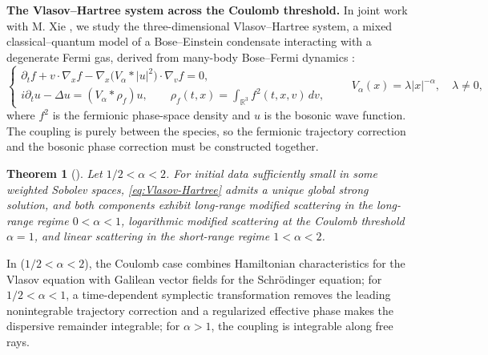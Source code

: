 \documentclass[10pt,reqno]{amsart}
\newtheorem{theorem}{Theorem}
\theoremstyle{definition}
\begin{document}
\noindent\textbf{The Vlasov--Hartree system across the Coulomb threshold.} In joint work with M. Xie \cite{HX26a,HX26b}, we study the three-dimensional Vlasov--Hartree system, a mixed classical--quantum model of a Bose--Einstein condensate interacting with a degenerate Fermi gas, derived from many-body Bose--Fermi dynamics \cite{CMP23}:
\begin{equation}\label{eq:Vlasov-Hartree}
\begin{cases}
\partial_t f+v\cdot\nabla_x f
-\nabla_x\bigl(V_\alpha*|u|^2\bigr)\cdot\nabla_v f=0,\\[0.3em]
i\partial_tu-\Delta u=(V_\alpha*\rho_f)u,
\qquad
\displaystyle
\rho_f(t,x)=\int_{\mathbb R^3}f^2(t,x,v)\,dv,
\end{cases}
\qquad
V_\alpha(x)=\lambda|x|^{-\alpha},
\quad \lambda\neq0,
\end{equation}
where $f^2$ is the fermionic phase-space density and $u$ is the bosonic wave function. The coupling is purely between the species, so the fermionic trajectory correction and the bosonic phase correction must be constructed together.
\begin{theorem}[\cite{HX26a,HX26b}]\label{thm:VH}
Let $1/2<\alpha<2$. For initial data sufficiently small in some weighted Sobolev spaces, \eqref{eq:Vlasov-Hartree} admits a unique global strong solution, and both components exhibit long-range modified scattering in the long-range regime $0<\alpha<1$, logarithmic modified scattering at the Coulomb threshold $\alpha=1$, and linear scattering in the short-range regime $1<\alpha<2$.
\end{theorem}
In \cite{HX26a} ($1/2<\alpha<2$), the Coulomb case combines Hamiltonian characteristics for the Vlasov equation with Galilean vector fields for the Schr\"odinger equation; for $1/2<\alpha<1$, a time-dependent symplectic transformation removes the leading nonintegrable trajectory correction and a regularized effective phase makes the dispersive remainder integrable; for $\alpha>1$, the coupling is integrable along free rays.
 
\smallskip
 
\end{document}
